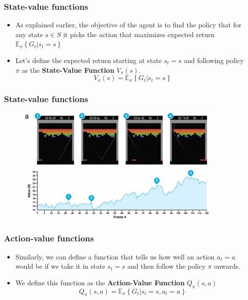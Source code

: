 \begin{frame}
    \frametitle{State-value functions}
    \begin{itemize}
        \item As explained earlier, the objective of the agent is to find the policy
              that for any state $s \in S$ it picks the action that maximizes expected
              return $\mathbb{E}_{\pi}\left \{ G_{t} | s_{t} = s \right \}$

        \pause

        \item Let's define the expected return starting at state $s_{t}=s$ and
              following policy $\pi$ as the \textbf{State-Value Function} $V_{\pi}(s)$.
              \begin{equation*}
                V_{\pi}(s) = \mathbb{E}_{\pi} \left \{ G_{t} | s_{t} = s \right \}
              \end{equation*}
    \end{itemize}
\end{frame}

\begin{frame}
    \frametitle{State-value functions}
    \begin{figure}
        \centering
        \includegraphics[width=0.9\textwidth]{./imgs/img_rl_vfunction_intuition.png}
    \end{figure}
\end{frame}

\begin{frame}
    \frametitle{Action-value functions}
    \begin{itemize}
        \item Similarly, we can define a function that tells us how well an action 
              $a_{t}=a$ would be if we take it in state $s_{t}=s$ and then follow
              the policy $\pi$ onwards.

        \pause

        \item We define this function as the \textbf{Action-Value Function} $Q_{\pi}(s,a)$
              \begin{equation*}
                Q_{\pi}(s,a) = \mathbb{E}_{\pi} \left \{ G_{t} | s_{t} = s, a_{t} = a \right \}
              \end{equation*}
    \end{itemize}
\end{frame}

